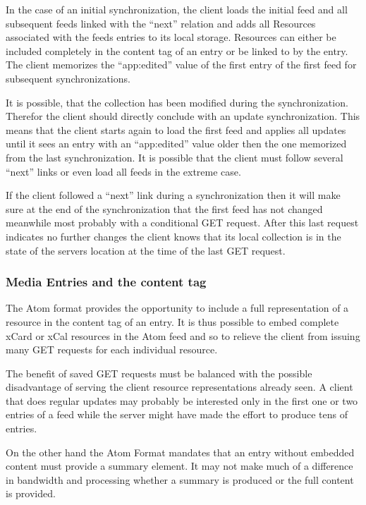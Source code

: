 \documentclass[12pt,a4paper]{scrartcl}		%
\begin{document}
In the case of an initial synchronization, the client loads the initial feed and
all subsequent feeds linked with the ``next'' relation and adds all Resources
associated with the feeds entries to its local storage. Resources can either be
included completely in the content tag of an entry or be linked to by the
entry. The client memorizes the ``app:edited'' value of the first entry of the
first feed for subsequent synchronizations.

It is possible, that the collection has been modified during the
synchronization. Therefor the client should directly conclude with an update
synchronization. This means that the client starts again to load the first feed
and applies all updates until it sees an entry with an ``app:edited'' value
older then the one memorized from the last synchronization. It is possible that
the client must follow several ``next'' links or even load all feeds in the
extreme case.

If the client followed a ``next'' link during a synchronization then it will
make sure at the end of the synchronization that the first feed has not changed
meanwhile most probably with a conditional GET request. After this last request
indicates no further changes the client knows that its local collection is in
the state of the servers location at the time of the last GET request.

\subsubsection{Media Entries and the content tag}
\label{sec:inline-feeds-or}

The Atom format provides the opportunity to include a full representation of a
resource in the content tag of an entry\cite[sec. 4.1.3]{RFC4287}. It is thus
possible to embed complete xCard or xCal resources in the Atom feed
and so to relieve the client from issuing many GET requests for each individual
resource.

The benefit of saved GET requests must be balanced with the possible
disadvantage of serving the client resource representations already seen. A
client that does regular updates may probably be interested only in the first
one or two entries of a feed while the server might have made the effort to
produce tens of entries.

On the other hand the Atom Format mandates that an entry without embedded
content must provide a summary element. It may not make much of a difference in
bandwidth and processing whether a summary is produced or the full content is
provided.
\end{document}
